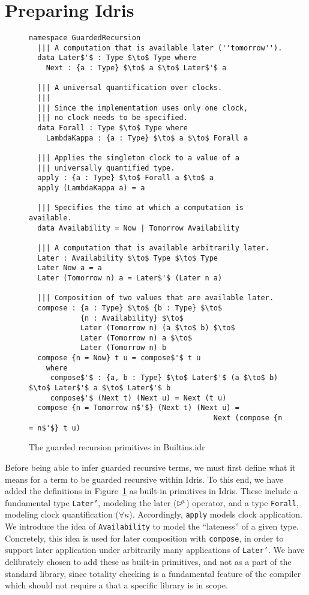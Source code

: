 \section{Preparing Idris}
\begin{figure}[h]
\begin{lstlisting}[mathescape,title=\idrisBlock]
namespace GuardedRecursion
  ||| A computation that is available later (''tomorrow'').
  data Later$'$ : Type $\to$ Type where
    Next : {a : Type} $\to$ a $\to$ Later$'$ a

  ||| A universal quantification over clocks.
  |||
  ||| Since the implementation uses only one clock,
  ||| no clock needs to be specified.
  data Forall : Type $\to$ Type where
    LambdaKappa : {a : Type} $\to$ a $\to$ Forall a
 
  ||| Applies the singleton clock to a value of a
  ||| universally quantified type.
  apply : {a : Type} $\to$ Forall a $\to$ a
  apply (LambdaKappa a) = a 

  ||| Specifies the time at which a computation is available.
  data Availability = Now | Tomorrow Availability

  ||| A computation that is available arbitrarily later.
  Later : Availability $\to$ Type $\to$ Type
  Later Now a = a
  Later (Tomorrow n) a = Later$'$ (Later n a)
  
  ||| Composition of two values that are available later.                             
  compose : {a : Type} $\to$ {b : Type} $\to$ 
            {n : Availability} $\to$ 
            Later (Tomorrow n) (a $\to$ b) $\to$ 
            Later (Tomorrow n) a $\to$ 
            Later (Tomorrow n) b
  compose {n = Now} t u = compose$'$ t u
    where
     compose$'$ : {a, b : Type} $\to$ Later$'$ (a $\to$ b) $\to$ Later$'$ a $\to$ Later$'$ b
     compose$'$ (Next t) (Next u) = Next (t u)
  compose {n = Tomorrow n$'$} (Next t) (Next u) = 
                                           Next (compose {n = n$'$} t u)
\end{lstlisting}
  \caption{The guarded recursion primitives in Builtins.idr}
  \label{fig:guarded_recursion_primitives}
\end{figure}

Before being able to infer guarded recursive terms, we must first define what it
means for a term to be guarded recursive within Idris. To this end, we have
added the definitions in Figure~\ref{fig:guarded_recursion_primitives} as
built-in primitives in Idris. These include a fundamental type \texttt{Later'},
modeling the later ($\rhd^{\!\!\kappa}$) operator, and a type \texttt{Forall},
modeling clock quantification ($\forall\kappa$). Accordingly, \texttt{apply}
models clock application. We introduce the idea of \texttt{Availability} to
model the ``lateness'' of a given type. Concretely, this idea is used for later
composition with \texttt{compose}, in order to support later application under
arbitrarily many applications of \texttt{Later'}. We have delibrately chosen to
add these as built-in primitives, and not as a part of the standard library,
since totality checking is a fundamental feature of the compiler which should
not require a that a specific library is in scope.

